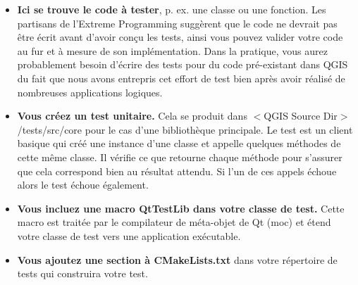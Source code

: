 \begin{itemize}
\item \textbf{Ici se trouve le code à tester}, p. ex. une classe ou une fonction. Les partisans de l'Extreme Programming suggèrent que le code ne devrait pas être écrit avant d'avoir conçu les tests, ainsi vous pouvez valider votre code au fur et  à mesure de son implémentation. Dans la pratique, vous aurez probablement besoin d'écrire des tests pour du code pré-existant dans QGIS du fait que nous avons entrepris cet effort de test bien après avoir réalisé de nombreuses applications logiques.

\item \textbf{Vous créez un test unitaire.} Cela se produit dans $<$QGIS Source Dir$>$/tests/src/core pour le cas d'une bibliothèque principale. Le test est un client basique qui créé une instance d'une classe et appelle quelques méthodes de cette même classe. Il vérifie ce que retourne chaque méthode pour s'assurer que cela correspond bien au résultat attendu. Si l'un de ces appels échoue alors le test échoue également.

\item \textbf{Vous incluez une macro QtTestLib dans votre classe de test.} Cette macro est traitée par le compilateur de méta-objet de Qt (moc) et étend votre classe de test vers une application exécutable.

% 
% 
% 
% 
\item \textbf{Vous ajoutez une section à CMakeLists.txt} dans votre répertoire de tests qui construira votre test.


\end{itemize}
